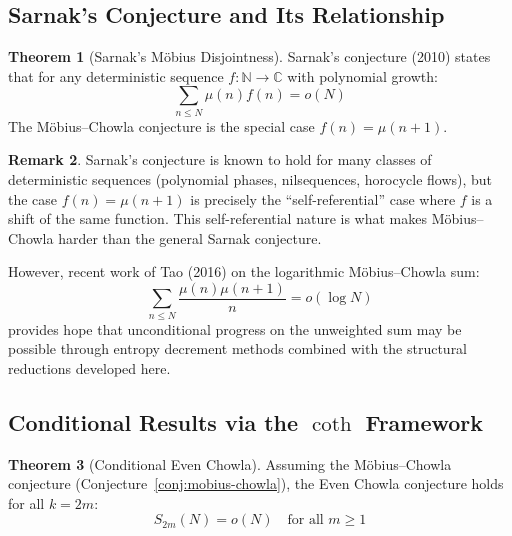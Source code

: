 \documentclass[11pt,a4paper]{article}
\theoremstyle{definition}
\newtheorem{theorem}{Theorem}[section]
\newtheorem{remark}[theorem]{Remark}
\begin{document}
\subsection{Sarnak's Conjecture and Its Relationship}

\begin{theorem}[Sarnak's M\"obius Disjointness]
\label{thm:sarnak}
Sarnak's conjecture (2010) states that for any deterministic sequence $f: \mathbb{N} \to \mathbb{C}$ with polynomial growth:
\begin{equation}
\sum_{n \le N} \mu(n) f(n) = o(N)
\end{equation}
The M\"obius--Chowla conjecture is the special case $f(n) = \mu(n+1)$.
\end{theorem}

\begin{remark}
Sarnak's conjecture is known to hold for many classes of deterministic sequences (polynomial phases, nilsequences, horocycle flows), but the case $f(n) = \mu(n+1)$ is precisely the ``self-referential'' case where $f$ is a shift of the same function. This self-referential nature is what makes M\"obius--Chowla harder than the general Sarnak conjecture.

However, recent work of Tao (2016) on the logarithmic M\"obius--Chowla sum:
\begin{equation}
\sum_{n \le N} \frac{\mu(n)\mu(n+1)}{n} = o(\log N)
\end{equation}
provides hope that unconditional progress on the unweighted sum may be possible through entropy decrement methods combined with the structural reductions developed here.
\end{remark}

\subsection{Conditional Results via the $\coth$ Framework}

\begin{theorem}[Conditional Even Chowla]
\label{thm:conditional}
Assuming the M\"obius--Chowla conjecture (Conjecture~\ref{conj:mobius-chowla}), the Even Chowla conjecture holds for all $k = 2m$:
\begin{equation}
S_{2m}(N) = o(N) \quad \text{for all } m \ge 1
\end{equation}
\end{theorem}
\end{document}
